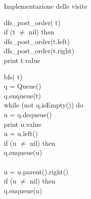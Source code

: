 \begin{code}{Implementazione delle visite}
\begin{minipage}[t]{0.48\textwidth}
        \noindent{}
        \rmbreak\ind dfs\_post\_order( t)\\
            \indf if (t $\neq$ nil) then\\
                dfs\_post\_order(t.left)\\
                dfs\_post\_order(t.right)\\
                print t.value\\
    \end{minipage}
    \hfill
    \begin{minipage}[t]{0.48\textwidth}
        \rmbreak\ind bfs( t)\\
             q = Queue()\\
            q.enqueue(t)\\
            \indf while (not q.isEmpty()) do\\
                 u = q.dequeue()\\
                print u.value\\
                u = u.left()\\
                \indff if (u $\neq$ nil) then\\
                    q.enqueue(u)\\
                
                \rmbreak\indf\\
                u = u.parent().right()\\
                \indff if (u $\neq$ nil) then\\
                    q.enqueue(u)\\
    \end{minipage}
\end{code}\noindent
